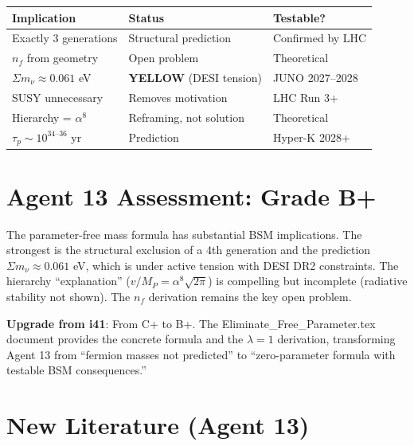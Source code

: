\documentclass[11pt,a4paper]{article}
\newcommand{\YELLOW}{\textcolor{dfdyellow}{\textbf{YELLOW}}}
\begin{document}
\begin{center}
\begin{tabular}{lll}
\toprule
\textbf{Implication} & \textbf{Status} & \textbf{Testable?} \\
\midrule
Exactly 3 generations & Structural prediction & Confirmed by LHC \\
$n_f$ from geometry & Open problem & Theoretical \\
$\Sigma m_\nu \approx 0.061$ eV & \YELLOW{} (DESI tension) & JUNO 2027--2028 \\
SUSY unnecessary & Removes motivation & LHC Run 3+ \\
Hierarchy = $\alpha^8$ & Reframing, not solution & Theoretical \\
$\tau_p \sim 10^{34\text{--}36}$ yr & Prediction & Hyper-K 2028+ \\
\bottomrule
\end{tabular}
\end{center}

\section{Agent 13 Assessment: Grade B+}

The parameter-free mass formula has substantial BSM implications. The strongest is the structural exclusion of a 4th generation and the prediction $\Sigma m_\nu \approx 0.061$ eV, which is under active tension with DESI DR2 constraints. The hierarchy ``explanation'' ($v/M_P = \alpha^8\sqrt{2\pi}$) is compelling but incomplete (radiative stability not shown). The $n_f$ derivation remains the key open problem.

\textbf{Upgrade from i41}: From C+ to B+. The Eliminate\_Free\_Parameter.tex document provides the concrete formula and the $\lambda = 1$ derivation, transforming Agent 13 from ``fermion masses not predicted'' to ``zero-parameter formula with testable BSM consequences.''

\section{New Literature (Agent 13)}
\end{document}
